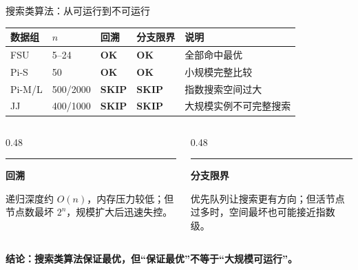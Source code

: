 \documentclass[9pt]{ctexbeamer}
\newenvironment{leftblock}[1]{%
  \vspace{0.3cm}
  \begin{beamercolorbox}[wd=\textwidth,leftskip=0.4cm,rightskip=0.4cm]{}
    \textcolor{ember}{\rule{2.5pt}{0.55cm}}\hspace{0.2cm}
    {\bfseries\color{ink}#1}
    \par\vspace{0.1cm}
    \hspace{0.35cm}\begin{minipage}{\dimexpr\textwidth-1.2cm\relax}
}{%
    \end{minipage}
  \end{beamercolorbox}
  \vspace{0.15cm}
}
\newcommand{\hi}[1]{\textcolor{ember}{\textbf{#1}}}
\newcommand{\blu}[1]{\textcolor{accent}{\textbf{#1}}}
\begin{document}
\begin{frame}{搜索类算法：从可运行到不可运行}

\vspace{-0.15cm}
\begin{center}
\renewcommand{\arraystretch}{1.35}
\small
\begin{tabular}{p{2.2cm}p{1.5cm}p{1.8cm}p{1.8cm}p{2.35cm}}
\toprule
\textbf{数据组} & \textbf{$n$} & \textbf{回溯} & \textbf{分支限界} & \textbf{说明} \\
\midrule
FSU & 5--24 & \blu{OK} & \blu{OK} & 全部命中最优 \\
Pi-S & 50 & \blu{OK} & \blu{OK} & 小规模完整比较 \\
Pi-M/L & 500/2000 & \hi{SKIP} & \hi{SKIP} & 指数搜索空间过大 \\
JJ & 400/1000 & \hi{SKIP} & \hi{SKIP} & 大规模实例不可完整搜索 \\
\bottomrule
\end{tabular}
\end{center}

\vspace{0.25cm}
\begin{columns}[T]
\begin{column}{0.48\textwidth}
\begin{leftblock}{回溯}
{\footnotesize\color{slate}递归深度约 $O(n)$，内存压力较低；但节点数最坏 $2^n$，规模扩大后迅速失控。}
\end{leftblock}
\end{column}
\begin{column}{0.48\textwidth}
\begin{leftblock}{分支限界}
{\footnotesize\color{slate}优先队列让搜索更有方向；但活节点过多时，空间最坏也可能接近指数级。}
\end{leftblock}
\end{column}
\end{columns}

\vspace{0.08cm}
\begin{center}
{\small\color{ink}\textbf{结论：搜索类算法保证最优，但“保证最优”不等于“大规模可运行”。}}
\end{center}

\end{frame}
\end{document}
